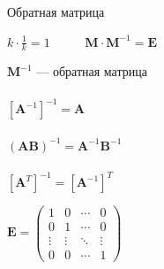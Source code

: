 \documentclass[10pt]{beamer}
\begin{document}
	\begin{frame}{Обратная матрица}
		
		\begin{center}
			
			$k\cdot\displaystyle\frac{1}{k}=1$ \ \ \ \ \   $\mathbf M\cdot \mathbf M^{-1}=\mathbf E$
			
		\end{center}
		
		{
			$\mathbf M^{-1}$ --- обратная матрица \\ ~ \\
			
			$\left[ \mathbf A^{-1}\right]^{-1} = \mathbf A$ \\ ~ \\
			
			$ \left( \mathbf{AB} \right) ^{-1}=\mathbf A^{-1}\mathbf B^{-1}$ \\~\\
			
			$ \left[\mathbf A^T\right]^{-1}  = \left[\mathbf A^{-1}\right]^{T} $
			
			
			
		}
		{
			$\mathbf E = \begin{pmatrix} 1 & 0 & \cdots & 0 \\ 0 & 1 & \cdots & 0 \\ \vdots & \vdots & \ddots & \vdots \\ 0 & 0 & \cdots & 1 \end{pmatrix}$
			
			
		}	
		
		
	\end{frame}
	
\end{document}
